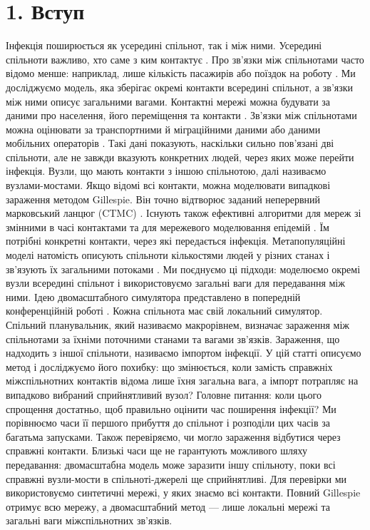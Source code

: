 ﻿\documentclass[11pt,a4paper]{article}
\begin{document}
\section*{1. Вступ}
Інфекція поширюється як усередині спільнот, так і між ними. Усередині спільноти важливо, хто саме з ким контактує \citep{keeling2005,pastorsatorras2015,kiss2017}. Про зв'язки між спільнотами часто відомо менше: наприклад, лише кількість пасажирів або поїздок на роботу \citep{balcan2009,barbosa2018human}. Ми досліджуємо модель, яка зберігає окремі контакти всередині спільнот, а зв'язки між ними описує загальними вагами.
Контактні мережі можна будувати за даними про населення, його переміщення та контакти \citep{eubank2004,danon2011}. Зв'язки між спільнотами можна оцінювати за транспортними й міграційними даними або даними мобільних операторів \citep{barbosa2018human,chang2021}. Такі дані показують, наскільки сильно пов'язані дві спільноти, але не завжди вказують конкретних людей, через яких може перейти інфекція. Вузли, що мають контакти з іншою спільнотою, далі називаємо вузлами-мостами.
Якщо відомі всі контакти, можна моделювати випадкові зараження методом Gillespie. Він точно відтворює заданий неперервний марковський ланцюг (CTMC) \citep{gillespie1977exact,gibson2000}. Існують також ефективні алгоритми для мереж зі змінними в часі контактами та для мережевого моделювання епідемій \citep{vestergaard2015,kuryliak2025simulating}. Їм потрібні конкретні контакти, через які передається інфекція. Метапопуляційні моделі натомість описують спільноти кількостями людей у різних станах і зв'язують їх загальними потоками \citep{colizza2007reaction,colizza2008,balcan2010modeling,ajelli2010}. Ми поєднуємо ці підходи: моделюємо окремі вузли всередині спільнот і використовуємо загальні ваги для передавання між ними.
Ідею двомасштабного симулятора представлено в попередній конференційній роботі \citep{kuryliak2025towards}. Кожна спільнота має свій локальний симулятор. Спільний планувальник, який називаємо макрорівнем, визначає зараження між спільнотами за їхніми поточними станами та вагами зв'язків. Зараження, що надходить з іншої спільноти, називаємо імпортом інфекції. У цій статті описуємо метод і досліджуємо його похибку: що змінюється, коли замість справжніх міжспільнотних контактів відома лише їхня загальна вага, а імпорт потрапляє на випадково вибраний сприйнятливий вузол?
Головне питання: коли цього спрощення достатньо, щоб правильно оцінити час поширення інфекції? Ми порівнюємо часи її першого прибуття до спільнот і розподіли цих часів за багатьма запусками. Також перевіряємо, чи могло зараження відбутися через справжні контакти. Близькі часи ще не гарантують можливого шляху передавання: двомасштабна модель може заразити іншу спільноту, поки всі справжні вузли-мости в спільноті-джерелі ще сприйнятливі. Для перевірки ми використовуємо синтетичні мережі, у яких знаємо всі контакти. Повний Gillespie отримує всю мережу, а двомасштабний метод --- лише локальні мережі та загальні ваги міжспільнотних зв'язків.
\end{document}
